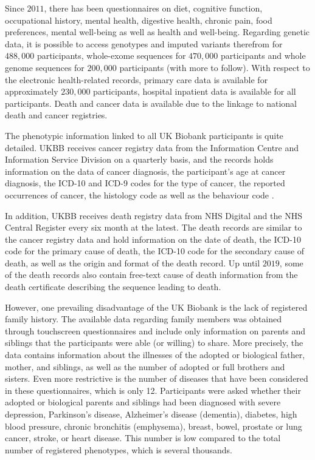 Since $ 2011 $, there has been questionnaires on diet, cognitive function, occupational history, mental health, digestive health, chronic pain, food preferences, mental well-being as well as health and well-being. Regarding genetic data, it is possible to access genotypes and imputed variants therefrom for $ 488,000 $ participants, whole-exome sequences for $ 470,000 $ participants and whole genome sequences for $ 200,000 $ participants (with more to follow)\cite{van2020exome,bycroft2018uk,ukbbdatatypes}. With respect to the electronic health-related records, primary care data is available for approximately $ 230,000 $ participants, hospital inpatient data is available for all participants. Death and cancer data is available due to the linkage to national death and cancer registries. 

The phenotypic information linked to all UK Biobank participants is quite detailed. UKBB receives cancer registry data from the Information Centre and Information Service Division on a quarterly basis, and the records holds information on the data of cancer diagnosis, the participant's age at cancer diagnosis, the ICD-10 and ICD-9 codes for the type of cancer, the reported occurrences of cancer, the histology code as well as the behaviour code \cite{ukbbcancerlinkage}. 

In addition, UKBB receives death registry data from NHS Digital and the NHS Central Register every six month at the latest. The death records are similar to the cancer registry data and hold information on the date of death, the ICD-10 code for the primary cause of death, the ICD-10 code for the secondary cause of death, as well as the origin and format of the death record. Up until $ 2019 $, some of the death records also contain free-text cause of death information from the death certificate describing the sequence leading to death\cite{ukbbdeathlinkage}.

However, one prevailing disadvantage of the UK Biobank is the lack of registered family history. The available data regarding family members was obtained through touchscreen questionnaires and include only information on parents and siblings that the participants were able (or willing) to share. More precisely, the data contains information about the illnesses of the adopted or biological father, mother, and siblings, as well as the number of adopted or full brothers and sisters. Even more restrictive is the number of diseases that have been considered in these questionnaires, which is only 12. Participants were asked whether their adopted or biological parents and siblings had been diagnosed with severe depression, Parkinson's disease, Alzheimer's disease (dementia), diabetes, high blood pressure, chronic bronchitis (emphysema), breast, bowel, prostate or lung cancer, stroke, or heart disease. This number is low compared to the total number of registered phenotypes, which is several thousands. 

